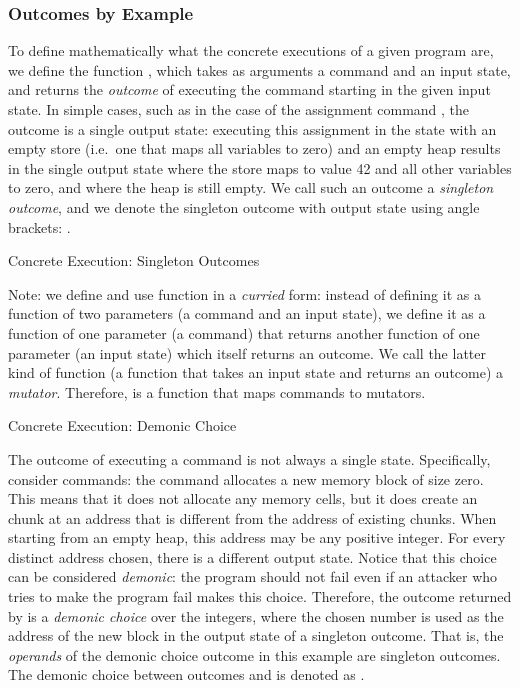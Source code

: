 \documentclass{CSML}
\theoremstyle{definition}\newtheorem{notation}[thm]{Notation}
\theoremstyle{plain}\newtheorem{satz}[thm]{Satz}
\begin{document}
\subsubsection{Outcomes by Example}

To define mathematically what the concrete executions of a 
given program are, we define the function , 
which takes as arguments a command and an input state, and 
returns the \emph{outcome} of executing the command starting in 
the given input state. In simple cases, such as in the case of 
the assignment command , the outcome is a 
single output state: executing this assignment in the state 
 with an empty store (i.e.~one that 
maps all variables to zero) and an empty heap results in the 
single output state where the store maps  to value 
42 and all other variables to zero, and where the heap is still 
empty. We call such an outcome a \emph{singleton outcome}, and 
we denote the singleton outcome with output state  
using angle brackets: .

\begin{exa}{Concrete Execution: Singleton Outcomes}

\end{exa}

Note: we define and use function  in a 
\emph{curried} form: instead of defining it as a function of 
two parameters (a command and an input state), we define it as 
a function of one parameter (a command) that returns another 
function of one parameter (an input state) which itself returns 
an outcome. We call the latter kind of function (a function 
that takes an input state and returns an outcome) a 
\emph{mutator}. Therefore,  is a function that 
maps commands to mutators.

\begin{exa}{Concrete Execution: Demonic Choice}





\end{exa}

The outcome of executing a command is not always a single 
state. Specifically, consider  commands: the 
command  allocates a new 
memory block of size zero. This means that it does not allocate 
any memory cells, but it does create an  chunk at 
an address that is different from the address of existing 
 chunks. When starting from an empty heap, this 
address may be any positive integer. For every distinct address 
chosen, there is a different output state. Notice that this 
choice can be considered \emph{demonic}: the program should not 
fail even if an attacker who tries to make the program fail 
makes this choice.  Therefore, the outcome returned by 
 is a \emph{demonic choice} over the integers, 
where the chosen number is used as the address of the new block 
in the output state of a singleton outcome. That is, the 
\emph{operands} of the demonic choice outcome in this example 
are singleton outcomes. The demonic choice between outcomes 
 and  is denoted as . 
\end{document}
